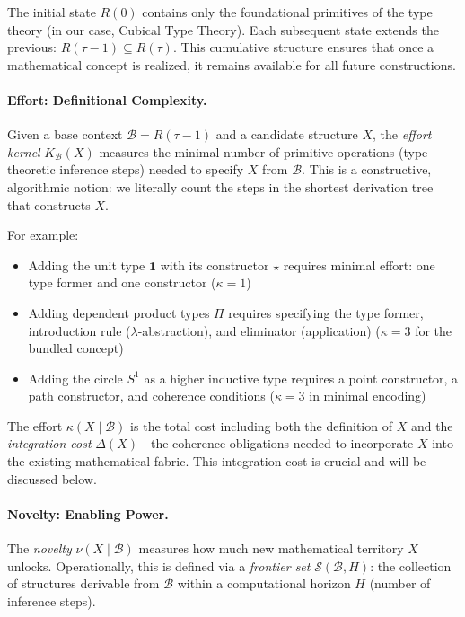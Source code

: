\documentclass[11pt]{article}
\theoremstyle{definition}
\begin{document}
The initial state $R(0)$ contains only the foundational primitives of the type theory (in our case, Cubical Type Theory). Each subsequent state extends the previous: $R(\tau-1) \subseteq R(\tau)$. This cumulative structure ensures that once a mathematical concept is realized, it remains available for all future constructions.

\paragraph{Effort: Definitional Complexity.}

Given a base context $\mathcal{B} = R(\tau-1)$ and a candidate structure $X$, the \emph{effort kernel} $K_{\mathcal{B}}(X)$ measures the minimal number of primitive operations (type-theoretic inference steps) needed to specify $X$ from $\mathcal{B}$. This is a constructive, algorithmic notion: we literally count the steps in the shortest derivation tree that constructs $X$.

For example:
\begin{itemize}
\item Adding the unit type $\mathbf{1}$ with its constructor $\star$ requires minimal effort: one type former and one constructor ($\kappa = 1$)
\item Adding dependent product types $\Pi$ requires specifying the type former, introduction rule ($\lambda$-abstraction), and eliminator (application) ($\kappa = 3$ for the bundled concept)
\item Adding the circle $S^1$ as a higher inductive type requires a point constructor, a path constructor, and coherence conditions ($\kappa = 3$ in minimal encoding)
\end{itemize}

The effort $\kappa(X \mid \mathcal{B})$ is the total cost including both the definition of $X$ and the \emph{integration cost} $\Delta(X)$—the coherence obligations needed to incorporate $X$ into the existing mathematical fabric. This integration cost is crucial and will be discussed below.

\paragraph{Novelty: Enabling Power.}

The \emph{novelty} $\nu(X \mid \mathcal{B})$ measures how much new mathematical territory $X$ unlocks. Operationally, this is defined via a \emph{frontier set} $\mathcal{S}(\mathcal{B}, H)$: the collection of structures derivable from $\mathcal{B}$ within a computational horizon $H$ (number of inference steps). 
\end{document}
